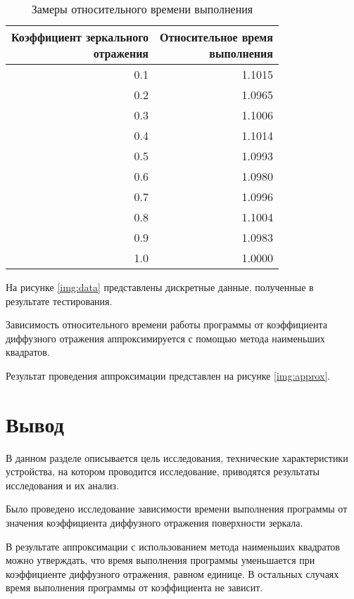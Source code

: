 \begin{table}[H]
	\centering
	\caption{\label{tab:time}Замеры относительного времени выполнения}
	\scalebox{0.75}
	{
		\begin{tabular}{|r|r|}
			\hline \specialcell{Коэффициент зеркального \\ отражения} & \specialcell{Относительное время \\выполнения}\\\hline
			\num{0.1} & \num{1.1015}  \\\hline
			\num{0.2} & \num{1.0965}  \\\hline
			\num{0.3} & \num{1.1006}  \\\hline
			\num{0.4} & \num{1.1014}  \\\hline
			\num{0.5} & \num{1.0993}  \\\hline
			\num{0.6} & \num{1.0980}  \\\hline
			\num{0.7} & \num{1.0996}  \\\hline
			\num{0.8} & \num{1.1004}  \\\hline
			\num{0.9} & \num{1.0983}  \\\hline
			\num{1.0} & \num{1.0000}  \\\hline
		\end{tabular}
}
\end{table}

На рисунке \ref{img:data} представлены дискретные данные, полученные в результате тестирования.


Зависимость относительного времени работы программы от коэффициента диффузного отражения аппроксимируется с помощью метода наименьших квадратов.

Результат проведения аппроксимации представлен на рисунке \ref{img:approx}.


\section*{Вывод}

В данном разделе описывается цель исследования, технические характеристики устройства, на котором проводится исследование, приводятся результаты исследования и их анализ.

Было проведено исследование зависимости времени выполнения программы от значения коэффициента диффузного отражения поверхности зеркала.

В результате аппроксимации с использованием метода наименьших квадратов можно утверждать, что время выполнения программы уменьшается при коэффициенте диффузного отражения, равном единице.
В остальных случаях время выполнения программы от коэффициента не зависит.